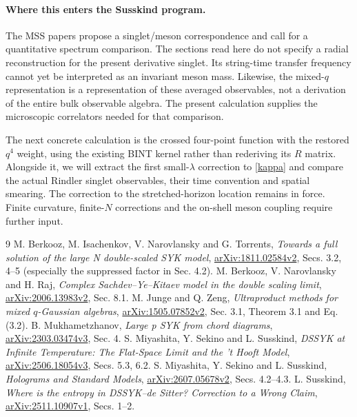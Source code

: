 \documentclass[11pt,a4paper]{article}
\begin{document}
\paragraph{Where this enters the Susskind program.}
The MSS papers \cite{mss,mss26} propose a singlet/meson correspondence and
call for a quantitative spectrum comparison. The sections read here
do not specify a radial reconstruction for the present derivative
singlet. Its string-time transfer frequency cannot yet be interpreted
as an invariant meson mass. Likewise, the mixed-$q$ representation is a
representation of these averaged observables, not a derivation of the
entire bulk observable algebra. The present calculation supplies the
microscopic correlators needed for that comparison.

The next concrete calculation is the crossed four-point function with
the restored $q^4$ weight, using the existing BINT kernel rather than
rederiving its $R$ matrix. Alongside it, we will extract the first
small-$\lambda$ correction to \eqref{kappa} and compare the actual
Rindler singlet observables, their time convention and spatial smearing.
The correction \cite{correction} to the stretched-horizon location
remains in force. Finite curvature, finite-$N$ corrections and the
on-shell meson coupling require further input.

\begin{thebibliography}{9}\small
{} M. Berkooz, M. Isachenkov, V. Narovlansky and G. Torrents,
\emph{Towards a full solution of the large N double-scaled SYK model},
\href{https://arxiv.org/abs/1811.02584v2}{arXiv:1811.02584v2},
Secs. 3.2, 4--5 (especially the suppressed factor in Sec. 4.2).
 M. Berkooz, V. Narovlansky and H. Raj,
\emph{Complex Sachdev--Ye--Kitaev model in the double scaling limit},
\href{https://arxiv.org/abs/2006.13983v2}{arXiv:2006.13983v2}, Sec. 8.1.
 M. Junge and Q. Zeng,
\emph{Ultraproduct methods for mixed $q$-Gaussian algebras},
\href{https://arxiv.org/abs/1505.07852v2}{arXiv:1505.07852v2},
Sec. 3.1, Theorem 3.1 and Eq. (3.2).
 B. Mukhametzhanov,
\emph{Large p SYK from chord diagrams},
\href{https://arxiv.org/abs/2303.03474v3}{arXiv:2303.03474v3}, Sec. 4.
 S. Miyashita, Y. Sekino and L. Susskind,
\emph{DSSYK at Infinite Temperature: The Flat-Space Limit and the 't Hooft Model},
\href{https://arxiv.org/abs/2506.18054v3}{arXiv:2506.18054v3}, Secs. 5.3, 6.2.
 S. Miyashita, Y. Sekino and L. Susskind,
\emph{Holograms and Standard Models},
\href{https://arxiv.org/abs/2607.05678v2}{arXiv:2607.05678v2}, Secs. 4.2--4.3.
 L. Susskind,
\emph{Where is the entropy in DSSYK--de Sitter? Correction to a Wrong Claim},
\href{https://arxiv.org/abs/2511.10907v1}{arXiv:2511.10907v1}, Secs. 1--2.
\end{thebibliography}
\end{document}
